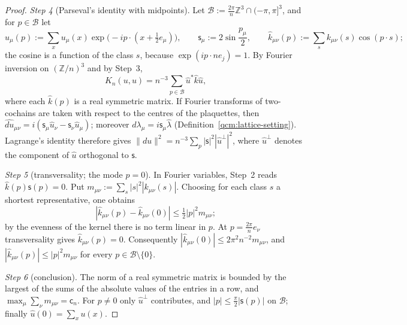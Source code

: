 \documentclass[11pt,letterpaper,reqno]{amsart}
\theoremstyle{definition}
\begin{document}
\begin{proof}
\emph{Step 4} (Parseval's identity with midpoints).
Let $\mathcal B:=\frac{2\pi}{n}\mathbb Z^3\cap(-\pi,\pi]^3$, and for $p\in\mathcal B$ let
\begin{equation*}
\hat u_\mu(p):=\sum_xu_\mu(x)\exp\bigl(-ip\cdot(x+\tfrac12e_\mu)\bigr),\qquad\mathsf s_\mu:=2\sin\frac{p_\mu}{2},\qquad\hat k_{\mu\nu}(p):=\sum_sk_{\mu\nu}(s)\cos(p\cdot s);
\end{equation*}
the cosine is a function of the class $s$, because $\exp(ip\cdot ne_j)=1$.
By Fourier inversion on $(\mathbb Z/n)^3$ and by Step~3,
\begin{equation*}
K_n(u,u)=n^{-3}\sum_{p\in\mathcal B}\hat u^*\hat k\hat u,
\end{equation*}
where each $\hat k(p)$ is a real symmetric matrix.
If Fourier transforms of two-cochains are taken with respect to the centres of the plaquettes, then $\widehat{du}_{\mu\nu}=\allowbreak i(\mathsf s_\mu\hat u_\nu-\mathsf s_\nu\hat u_\mu)$; moreover $\widehat{d\lambda}_\mu=i\mathsf s_\mu\hat\lambda$ (Definition~\ref{qcm:lattice-setting}).
Lagrange's identity therefore gives $\|du\|^2=n^{-3}\sum_p|\mathsf s|^2|\hat u^\perp|^2$, where $\hat u^\perp$ denotes the component of $\hat u$ orthogonal to $\mathsf s$.

\emph{Step 5} (transversality; the mode $p=0$).
In Fourier variables, Step~2 reads $\hat k(p)\mathsf s(p)=0$.
Put $m_{\mu\nu}:=\sum_s|s|^2|k_{\mu\nu}(s)|$.
Choosing for each class $s$ a shortest representative, one obtains
\begin{equation*}
|\hat k_{\mu\nu}(p)-\hat k_{\mu\nu}(0)|\le\tfrac12|p|^2m_{\mu\nu};
\end{equation*}
by the evenness of the kernel there is no term linear in $p$.
At $p=\frac{2\pi}{n}e_\nu$ transversality gives $\hat k_{\mu\nu}(p)=0$.
Consequently $|\hat k_{\mu\nu}(0)|\le2\pi^2n^{-2}m_{\mu\nu}$, and $|\hat k_{\mu\nu}(p)|\le|p|^2m_{\mu\nu}$ for every $p\in\mathcal B\setminus\{0\}$.

\emph{Step 6} (conclusion).
The norm of a real symmetric matrix is bounded by the largest of the sums of the absolute values of the entries in a row, and $\max_\mu\sum_\nu m_{\mu\nu}=\mathsf c_n$.
For $p\ne0$ only $\hat u^\perp$ contributes, and $|p|\le\frac\pi2|\mathsf s(p)|$ on $\mathcal B$; finally $\hat u(0)=\sum_xu(x)$.
\end{proof}
\end{document}
